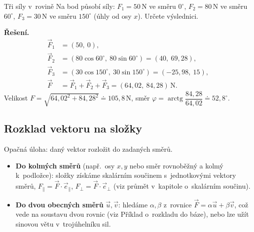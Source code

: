 \documentclass[a4paper,11pt]{article}
\newcommand{\jed}[1]{\,\mathrm{#1}}      %
\newcommand{\dc}{{,}}                    %
\begin{document}
\begin{priklad}{Tři síly v~rovině}
Na bod působí síly: $F_1=50\jed{N}$ ve směru $0^\circ$, $F_2=80\jed{N}$ ve směru
$60^\circ$, $F_3=30\jed{N}$ ve směru $150^\circ$ (úhly od osy $x$). Určete výslednici.

\medskip\noindent\textbf{Řešení.}
\begin{align*}
  \vec F_1&=(50,\ 0),\\
  \vec F_2&=(80\cos60^\circ,\ 80\sin60^\circ)=(40,\ 69\dc28),\\
  \vec F_3&=(30\cos150^\circ,\ 30\sin150^\circ)=(-25\dc98,\ 15),\\
  \vec F&=\vec F_1+\vec F_2+\vec F_3=(64\dc02,\ 84\dc28)\jed{N}.
\end{align*}
Velikost $F=\sqrt{64\dc02^2+84\dc28^2}\doteq105\dc8\jed{N}$, směr
$\varphi=\operatorname{arctg}\dfrac{84\dc28}{64\dc02}\doteq52\dc8^\circ$.
\end{priklad}

\subsection{Rozklad vektoru na složky}

Opačná úloha: daný vektor rozložit do zadaných směrů.

\begin{itemize}
  \item \textbf{Do kolmých směrů} (např.\ osy $x,y$ nebo směr rovnoběžný a kolmý
        k~podložce): složky získáme skalárním součinem s~jednotkovými vektory
        směrů, $F_{\parallel}=\vec F\cdot\vec e_{\parallel}$, $F_{\perp}=\vec F\cdot\vec e_{\perp}$
        (viz průmět v~kapitole o~skalárním součinu).
  \item \textbf{Do dvou obecných směrů} $\vec u,\vec v$: hledáme $\alpha,\beta$
        z~rovnice $\vec F=\alpha\vec u+\beta\vec v$, což vede na soustavu dvou rovnic
        (viz Příklad o~rozkladu do báze), nebo lze užít sinovou větu v~trojúhelníku sil.
\end{itemize}
\end{document}
